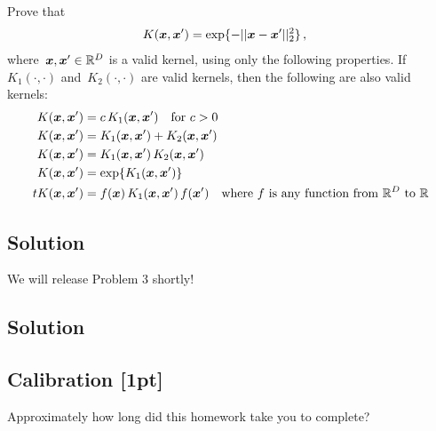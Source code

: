 \documentclass[submit]{harvardml}
\begin{document}
\newpage
\begin{problem}
Prove that
\begin{align*}
	K(\boldsymbol{x}, \boldsymbol{x}') &= \exp\{ -||\boldsymbol{x} - \boldsymbol{x}'||^2_2 \}\,,
\end{align*}
where~$\boldsymbol{x},\boldsymbol{x}'\in\mathbb{R}^D$ is a valid kernel, using only the following
properties.  If~$K_1(\cdot,\cdot)$ and~$K_2(\cdot,\cdot)$ are valid kernels,
then the following are also valid kernels:
\begin{align*}
	K(\boldsymbol{x}, \boldsymbol{x}') &= c\,K_1(\boldsymbol{x}, \boldsymbol{x}') \quad \text{for $c>0$}\\
	K(\boldsymbol{x}, \boldsymbol{x}') &= K_1(\boldsymbol{x}, \boldsymbol{x}') + K_2(\boldsymbol{x}, \boldsymbol{x}')\\
	K(\boldsymbol{x}, \boldsymbol{x}') &= K_1(\boldsymbol{x}, \boldsymbol{x}')\,K_2(\boldsymbol{x}, \boldsymbol{x}')\\
	K(\boldsymbol{x}, \boldsymbol{x}') &= \exp\{ K_1(\boldsymbol{x}, \boldsymbol{x}') \}\\t
  K(\boldsymbol{x}, \boldsymbol{x}') &= f(\boldsymbol{x})\,K_1(\boldsymbol{x}, \boldsymbol{x}')\,f(\boldsymbol{x}') \quad
  \text{where $f$ is any function from~$\mathbb{R}^D$ to $\mathbb{R}$}
\end{align*}

 \end{problem}
\subsection*{Solution}


\newpage
\begin{problem}
We will release Problem 3 shortly!
\end{problem}

\subsection*{Solution}



\newpage

\subsection*{Calibration [1pt]}
Approximately how long did this homework take you to complete?
\end{document}
